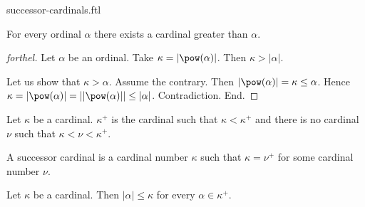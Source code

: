\documentclass{naproche-library}
\begin{document}
\begin{smodule}[title=Successor Cardinals]{successor-cardinals.ftl}

\begin{lemma}[forthel,id=SET_THEORY_06_489264832709174]
  For every ordinal $\alpha$ there exists a cardinal greater than $\alpha$.
\end{lemma}
\begin{proof}[forthel]
  Let $\alpha$ be an ordinal.
  Take $\kappa = |\pow(\alpha)|$.
  Then $\kappa > |\alpha|$.

  Let us show that $\kappa > \alpha$.
    Assume the contrary.
    Then $|\pow(\alpha)|
      = \kappa
      \leq \alpha$.
    Hence $\kappa
      = |\pow(\alpha)|
      = ||\pow(\alpha)||
      \leq |\alpha|$.
    Contradiction.
  End.
\end{proof}

\begin{definition}[forthel,id=SET_THEORY_06_9568425123021254]
  Let $\kappa$ be a cardinal.
  $\kappa^+$ is the cardinal such that $\kappa < \kappa^+$ and there is no cardinal $\nu$ such that $\kappa < \nu < \kappa^+$.
\end{definition}

\begin{definition}[forthel,id=SET_THEORY_06_6818986081648640]
  A successor cardinal is a cardinal number $\kappa$ such that $\kappa = \nu^+$ for some cardinal number $\nu$.
\end{definition}

\begin{proposition}[forthel,id=SET_THEORY_06_5231202126545218]
  Let $\kappa$ be a cardinal.
  Then $|\alpha| \leq \kappa$ for every $\alpha \in \kappa^+$.
\end{proposition}
\end{smodule}
\end{document}
